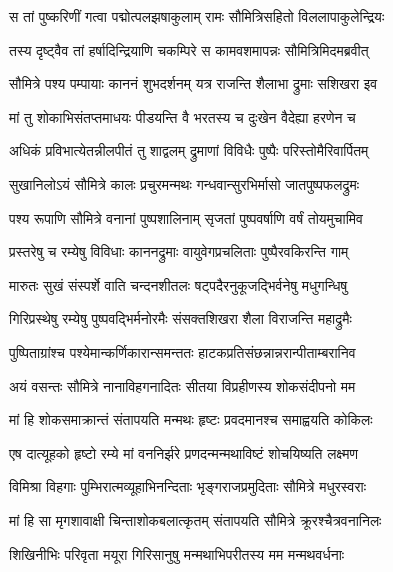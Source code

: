 

\twolineshloka
{स तां पुष्करिणीं गत्वा पद्मोत्पलझषाकुलाम्}
{रामः सौमित्रिसहितो विललापाकुलेन्द्रियः} %

\twolineshloka
{तस्य दृष्ट्वैव तां हर्षादिन्द्रियाणि चकम्पिरे}
{स कामवशमापन्नः सौमित्रिमिदमब्रवीत्} %

\twolineshloka
{सौमित्रे पश्य पम्पायाः काननं शुभदर्शनम्}
{यत्र राजन्ति शैलाभा द्रुमाः सशिखरा इव} %

\twolineshloka
{मां तु शोकाभिसंतप्तमाधयः पीडयन्ति वै}
{भरतस्य च दुःखेन वैदेह्या हरणेन च} %

\twolineshloka
{अधिकं प्रविभात्येतन्नीलपीतं तु शाद्वलम्}
{द्रुमाणां विविधैः पुष्पैः परिस्तोमैरिवार्पितम्} %

\twolineshloka
{सुखानिलोऽयं सौमित्रे कालः प्रचुरमन्मथः}
{गन्धवान्सुरभिर्मासो जातपुष्पफलद्रुमः} %

\twolineshloka
{पश्य रूपाणि सौमित्रे वनानां पुष्पशालिनाम्}
{सृजतां पुष्पवर्षाणि वर्षं तोयमुचामिव} %

\twolineshloka
{प्रस्तरेषु च रम्येषु विविधाः काननद्रुमाः}
{वायुवेगप्रचलिताः पुष्पैरवकिरन्ति गाम्} %

\twolineshloka
{मारुतः सुखं संस्पर्शे वाति चन्दनशीतलः}
{षट्पदैरनुकूजद्भिर्वनेषु मधुगन्धिषु} %

\twolineshloka
{गिरिप्रस्थेषु रम्येषु पुष्पवद्भिर्मनोरमैः}
{संसक्तशिखरा शैला विराजन्ति महाद्रुमैः} %

\twolineshloka
{पुष्पिताग्रांश्च पश्येमान्कर्णिकारान्समन्ततः}
{हाटकप्रतिसंछन्नान्नरान्पीताम्बरानिव} %

\twolineshloka
{अयं वसन्तः सौमित्रे नानाविहगनादितः}
{सीतया विप्रहीणस्य शोकसंदीपनो मम} %

\twolineshloka
{मां हि शोकसमाक्रान्तं संतापयति मन्मथः}
{हृष्टः प्रवदमानश्च समाह्वयति कोकिलः} %

\twolineshloka
{एष दात्यूहको हृष्टो रम्ये मां वननिर्झरे}
{प्रणदन्मन्मथाविष्टं शोचयिष्यति लक्ष्मण} %

\twolineshloka
{विमिश्रा विहगाः पुम्भिरात्मव्यूहाभिनन्दिताः}
{भृङ्गराजप्रमुदिताः सौमित्रे मधुरस्वराः} %

\twolineshloka
{मां हि सा मृगशावाक्षी चिन्ताशोकबलात्कृतम्}
{संतापयति सौमित्रे क्रूरश्चैत्रवनानिलः} %

\twolineshloka
{शिखिनीभिः परिवृता मयूरा गिरिसानुषु}
{मन्मथाभिपरीतस्य मम मन्मथवर्धनाः} %

